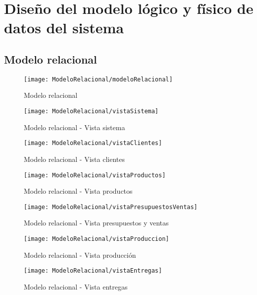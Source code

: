 \section{Diseño del modelo lógico y físico de datos del sistema}
    \subsection{Modelo relacional}
        \begin{figure}[H]
            \centering
            \texttt{[image: ModeloRelacional/modeloRelacional]}
            \caption{Modelo relacional}
        \label{fig:Modelo relacional}
        \end{figure}
        \clearpage %
        \begin{figure}[H]
            \centering
            \texttt{[image: ModeloRelacional/vistaSistema]}
            \caption{Modelo relacional - Vista sistema}
        \label{fig:Modelo relacional - Vista sistema}
        \end{figure}
        \begin{figure}[H]
            \centering
            \texttt{[image: ModeloRelacional/vistaClientes]}
            \caption{Modelo relacional - Vista clientes}
        \label{fig:Modelo relacional - Vista clientes}
        \end{figure}
        \begin{figure}[H]
            \centering
            \texttt{[image: ModeloRelacional/vistaProductos]}
            \caption{Modelo relacional - Vista productos}
        \label{fig:Modelo relacional - Vista productos}
        \end{figure}
        \begin{figure}[H]
            \centering
            \texttt{[image: ModeloRelacional/vistaPresupuestosVentas]}
            \caption{Modelo relacional - Vista presupuestos y ventas}
        \label{fig:Modelo relacional - Vista presupuestos y ventas}
        \end{figure}
        \begin{figure}[H]
            \centering
            \texttt{[image: ModeloRelacional/vistaProduccion]}
            \caption{Modelo relacional - Vista producción}
        \label{fig:Modelo relacional - Vista producción}
        \end{figure}

        \begin{figure}[H]
            \centering
            \texttt{[image: ModeloRelacional/vistaEntregas]}
            \caption{Modelo relacional - Vista entregas}
        \label{fig:Modelo relacional - Vista entregas}
        \end{figure}